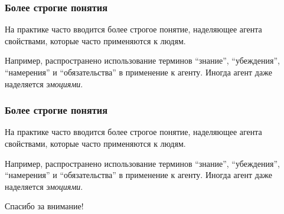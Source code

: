 \documentclass{beamer}
\begin{document}
\begin{frame}
\frametitle{Более строгие понятия}
  На практике часто вводится более строгое понятие, наделяющее агента
  свойствами, которые часто применяются к людям.
  
  Например, распространено использование терминов ``знание'', ``убеждения'',
  ``намерения'' и ``обязательства'' в применение к агенту. Иногда агент даже
  наделяется {\it эмоциями}.
\end{frame}

\begin{frame}
\frametitle{Более строгие понятия}
  На практике часто вводится более строгое понятие, наделяющее агента
  свойствами, которые часто применяются к людям.
  
  Например, распространено использование терминов ``знание'', ``убеждения'',
  ``намерения'' и ``обязательства'' в применение к агенту. Иногда агент даже
  наделяется {\it эмоциями}.
\end{frame}

\begin{frame}{}
\addtocounter{framenumber}{-1}
\begin{center}
\LARGE{Спасибо за внимание!}
\end{center}
\end{frame}
\end{document}
